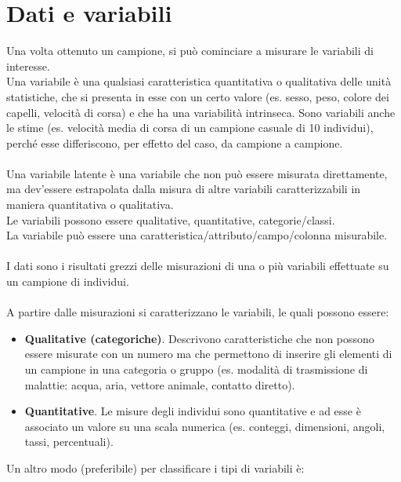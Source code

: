 \documentclass[10pt, draft]{book}
\begin{document}
\section{Dati e variabili}
Una volta ottenuto un campione, si può cominciare a misurare le variabili di interesse.
\\
Una variabile è una qualsiasi caratteristica quantitativa o qualitativa delle unità statistiche, che si presenta in esse con un certo valore (es. sesso, peso, colore dei capelli, velocità di corsa) e che ha una variabilità intrinseca. Sono variabili anche le stime (es. velocità media di corsa di un campione casuale di 10 individui), perché esse differiscono, per effetto del caso, da campione a campione.
\\
\\
Una variabile latente è una variabile che non può essere misurata direttamente, ma dev’essere estrapolata dalla misura di altre variabili caratterizzabili in maniera quantitativa o qualitativa.
\\
Le variabili possono essere qualitative, quantitative, categorie/classi.
\\
La variabile può essere una caratteristica/attributo/campo/colonna misurabile.
\\
\\
I dati sono i risultati grezzi delle misurazioni di una o più variabili effettuate su un campione di individui.
\\
\\
A partire dalle misurazioni si caratterizzano le variabili, le quali possono essere:
\begin{itemize}
    \item \textbf{Qualitative (categoriche)}. Descrivono caratteristiche che non possono essere misurate con un numero ma che permettono di inserire gli elementi di un campione in una categoria o gruppo (es. modalità di trasmissione di malattie: acqua, aria, vettore animale, contatto diretto).
    \item \textbf{Quantitative}. Le misure degli individui sono quantitative e ad esse è associato un valore su una scala numerica (es. conteggi, dimensioni, angoli, tassi, percentuali).
\end{itemize}
Un altro modo (preferibile) per classificare i tipi di variabili è:
\end{document}
